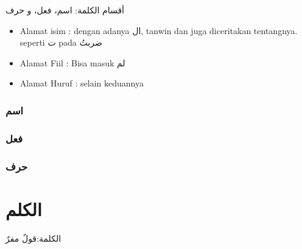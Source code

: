 \documentclass[
]{book}
\providecommand{\tightlist}{%
  \setlength{\itemsep}{0pt}\setlength{\parskip}{0pt}}
\begin{document}
أقسام الكلمة: اسم، فعل، و حرف

\begin{itemize}
\tightlist
\item
  Alamat isim : dengan adanya ال, tanwin dan juga diceritakan tentangnya. seperti ت pada ضربتُ
\item
  Alamat Fiil : Bisa masuk لم
\item
  Alamat Huruf : selain keduannya
\end{itemize}

\hypertarget{ux627ux633ux645}{%
\subsection{اسم}\label{ux627ux633ux645}}

\hypertarget{ux641ux639ux644}{%
\subsection{فعل}\label{ux641ux639ux644}}

\hypertarget{ux62dux631ux641}{%
\subsection{حرف}\label{ux62dux631ux641}}

\hypertarget{ux627ux644ux643ux644ux645}{%
\chapter{الكلم}\label{ux627ux644ux643ux644ux645}}

الكلمة:قولٌ مفرٌ

  
\end{document}
